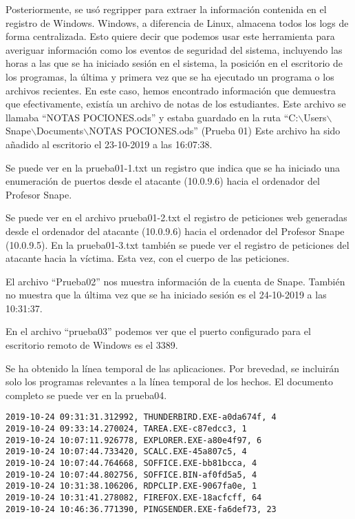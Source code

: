 Posteriormente, se usó regripper \cite{regripper} para extraer la información contenida en el registro de Windows. 
Windows, a diferencia de Linux, almacena todos los logs de forma centralizada.
Esto quiere decir que podemos usar este herramienta para averiguar información como los eventos de seguridad del sistema, incluyendo las horas a las que se ha iniciado sesión en el sistema, la posición en el escritorio de los programas, la última y primera vez que se ha ejecutado un programa o los archivos recientes.
En este caso, hemos encontrado información que demuestra que efectivamente, existía un archivo de notas de los estudiantes. Este archivo se llamaba ``NOTAS POCIONES.ods'' y estaba guardado en la ruta ``C:$\backslash$Users$\backslash$Snape$\backslash$Documents$\backslash$NOTAS POCIONES.ods'' (Prueba 01)
Este archivo ha sido añadido al escritorio el 23-10-2019 a las 16:07:38.

Se puede ver en la prueba01-1.txt un registro que indica que se ha iniciado una enumeración de puertos desde el atacante (10.0.9.6) hacia el ordenador del Profesor Snape.

Se puede ver en el archivo prueba01-2.txt el registro de peticiones web generadas desde el ordenador del atacante (10.0.9.6) hacia el ordenador del Profesor Snape (10.0.9.5).
En la prueba01-3.txt también se puede ver el registro de peticiones del atacante hacia la víctima.
Esta vez, con el cuerpo de las peticiones.

El archivo ``Prueba02'' nos muestra información de la cuenta de Snape. También no muestra que la última vez que se ha iniciado sesión es el 24-10-2019 a las 10:31:37.

En el archivo ``prueba03'' podemos ver que el puerto configurado para el escritorio remoto de Windows es el 3389.

Se ha obtenido la línea temporal de las aplicaciones. Por brevedad, se incluirán solo los programas relevantes a la línea temporal de los hechos. El documento completo se puede ver en la prueba04.

\begin{lstlisting}
2019-10-24 09:31:31.312992, THUNDERBIRD.EXE-a0da674f, 4
2019-10-24 09:33:14.270024, TAREA.EXE-c87edcc3, 1
2019-10-24 10:07:11.926778, EXPLORER.EXE-a80e4f97, 6
2019-10-24 10:07:44.733420, SCALC.EXE-45a807c5, 4
2019-10-24 10:07:44.764668, SOFFICE.EXE-bb81bcca, 4
2019-10-24 10:07:44.802756, SOFFICE.BIN-af0fd5a5, 4
2019-10-24 10:31:38.106206, RDPCLIP.EXE-9067fa0e, 1
2019-10-24 10:31:41.278082, FIREFOX.EXE-18acfcff, 64
2019-10-24 10:46:36.771390, PINGSENDER.EXE-fa6def73, 23
\end{lstlisting}


